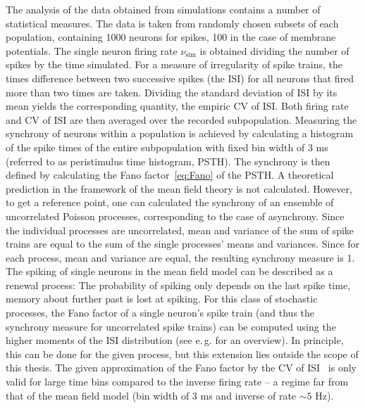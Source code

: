 The analysis of the data obtained from simulations contains a number of 
statistical measures. The data is taken from randomly chosen subsets of each population, 
containing 1000 neurons for spikes, 100 in the case of membrane potentials. 
The single neuron firing rate $\nu_\text{sim}$ is 
obtained dividing the number of spikes by the time simulated. 
For a measure of irregularity of spike trains, the times difference
between two successive spikes (the ISI) for all neurons that fired more than two times 
are taken. Dividing the standard deviation of ISI by its mean
yields the corresponding quantity, the empiric CV of ISI. Both firing rate and CV of ISI 
are then averaged over the recorded subpopulation. 
Measuring the synchrony of neurons within a population is achieved by 
calculating a histogram of the spike times of the entire subpopulation
with fixed bin width of $3$ ms (referred to as peristimulus time histogram, PSTH).
The synchrony is then defined by calculating the Fano factor~\eqref{eq:Fano} of the PSTH.
A theoretical prediction in the framework of the mean field theory is not calculated. 
However, to get a reference point, one can calculated the synchrony of an ensemble 
of uncorrelated Poisson processes, corresponding to the case of asynchrony. 
Since the individual processes are uncorrelated, mean and variance of the sum of 
spike trains are equal to the sum of the single processes' means and variances. 
Since for each process, mean and variance are equal, the resulting synchrony measure is 1. 
The spiking of single neurons in the mean field model can be described as a renewal 
process: The probability of spiking only depends on the last spike time, memory about 
further past is lost at spiking. For this class of stochastic processes, the Fano factor 
of a single neuron's spike train (and thus the synchrony measure for uncorrelated spike trains)
can be computed using the higher moments of the
ISI distribution (see e.\,g.  for an overview). In principle,
this can be done for the given process, but this extension lies outside the scope of this
thesis. The given approximation of the Fano factor by the CV of ISI~\cite{van2010stochastic}
is only valid for large time bins compared to the inverse firing rate -- a regime far from 
that of the mean field model (bin width of 3 ms and inverse of rate $\sim 5$ Hz).

